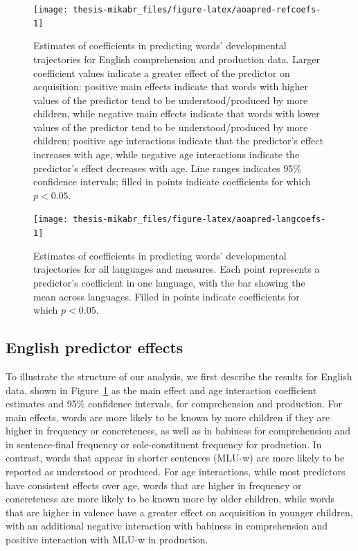 \documentclass[
   11pt,
       ]{book}
\begin{document}
\begin{figure}

{\centering \texttt{[image: thesis-mikabr\_files/figure-latex/aoapred-refcoefs-1]} 

}

\caption{Estimates of coefficients in predicting words' developmental trajectories for English comprehension and production data. Larger coefficient values indicate a greater effect of the predictor on acquisition: positive main effects indicate that words with higher values of the predictor tend to be understood/produced by more children, while negative main effects indicate that words with lower values of the predictor tend to be understood/produced by more children; positive age interactions indicate that the predictor's effect increases with age, while negative age interactions indicate the predictor's effect decreases with age. Line ranges indicates 95\% confidence intervals; filled in points indicate coefficients for which $p < 0.05$.}\label{fig:aoapred-refcoefs}
\end{figure}

\begin{figure}

{\centering \texttt{[image: thesis-mikabr\_files/figure-latex/aoapred-langcoefs-1]} 

}

\caption{Estimates of coefficients in predicting words' developmental trajectories for all languages and measures. Each point represents a predictor's coefficient in one language, with the bar showing the mean across languages. Filled in points indicate coefficients for which $p < 0.05$.}\label{fig:aoapred-langcoefs}
\end{figure}

\hypertarget{english-predictor-effects}{%
\subsection{English predictor effects}\label{english-predictor-effects}}

To illustrate the structure of our analysis, we first describe the results for English data, shown in Figure~\ref{fig:aoapred-refcoefs} as the main effect and age interaction coefficient estimates and 95\% confidence intervals, for comprehension and production. For main effects, words are more likely to be known by more children if they are higher in frequency or concreteness, as well as in babiness for comprehension and in sentence-final frequency or sole-constituent frequency for production. In contrast, words that appear in shorter sentences (MLU-w) are more likely to be reported as understood or produced. For age interactions, while most predictors have consistent effects over age, words that are higher in frequency or concreteness are more likely to be known more by older children, while words that are higher in valence have a greater effect on acquisition in younger children, with an additional negative interaction with babiness in comprehension and positive interaction with MLU-w in production.
\end{document}
